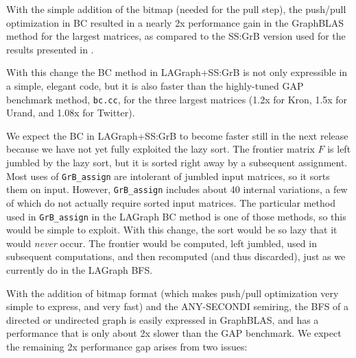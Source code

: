 
With the simple addition of the bitmap (needed for the pull step), the
push/pull optimization in BC resulted in a nearly 2x performance gain in the
GraphBLAS method for the largest matrices, as compared to the SS:GrB version
used for the results presented in \cite{DBLP:conf/iiswc/AzadABBCDDDDFGG20}.

With this change the BC method in LAGraph+SS:GrB is not only expressible in a
simple, elegant code, but it is also faster than the highly-tuned GAP benchmark
method, \verb'bc.cc', for the three largest matrices (1.2x for Kron, 1.5x for
Urand, and 1.08x for Twitter).

We expect the BC in LAGraph+SS:GrB to become faster still in the next
release because we have not yet fully exploited the lazy sort.  The frontier
matrix $F$ is left jumbled by the lazy sort, but it is sorted right away by a
subsequent assignment.  Most uses of \verb'GrB_assign' are intolerant of
jumbled input matrices, so it sorts them on input.  However, \verb'GrB_assign'
includes about 40 internal variations, a few of which do not actually require
sorted input matrices.  The particular method used in \verb'GrB_assign' in the
LAGraph BC method is one of those methods, so this would be simple to exploit.
With this change, the sort would be so lazy that it would {\em never} occur.
The frontier would be computed, left jumbled, used in subsequent computations,
and then recomputed (and thus discarded), just as we currently do in the
LAGraph BFS.

With the addition of bitmap format (which makes push/pull optimization very
simple to express, and very fast) and the ANY-SECONDI semiring, the BFS of a
directed or undirected graph is easily expressed in GraphBLAS, and has a
performance that is only about 2x slower than the GAP benchmark.  We expect
the remaining 2x performance gap arises from two issues:

